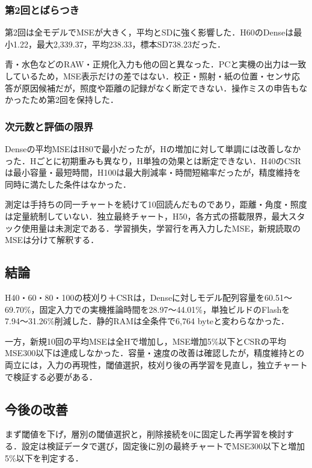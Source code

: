 \documentclass[
  10pt,
  a4paper,
]{article}
\begin{document}
\subsubsection{第2回とばらつき}\label{ux7b2c2ux56deux3068ux3070ux3089ux3064ux304d}

第2回は全モデルでMSEが大きく，平均とSDに強く影響した．H60のDenseは最小1.22，最大2,339.37，平均238.33，標本SD738.23だった．

青・水色などのRAW・正規化入力も他の回と異なった．PCと実機の出力は一致しているため，MSE表示だけの差ではない．校正・照射・紙の位置・センサ応答が原因候補だが，照度や距離の記録がなく断定できない．操作ミスの申告もなかったため第2回を保持した．

\subsubsection{次元数と評価の限界}\label{ux6b21ux5143ux6570ux3068ux8a55ux4fa1ux306eux9650ux754c}

Denseの平均MSEはH80で最小だったが，Hの増加に対して単調には改善しなかった．Hごとに初期重みも異なり，H単独の効果とは断定できない．H40のCSRは最小容量・最短時間，H100は最大削減率・時間短縮率だったが，精度維持を同時に満たした条件はなかった．

測定は手持ちの同一チャートを続けて10回読んだものであり，距離・角度・照度は定量統制していない．独立最終チャート，H50，各方式の搭載限界，最大スタック使用量は未測定である．学習損失，学習行を再入力したMSE，新規読取のMSEは分けて解釈する．

\subsection{結論}\label{ux7d50ux8ad6}

H40・60・80・100の枝刈り＋CSRは，Denseに対しモデル配列容量を60.51〜69.70\%，固定入力での実機推論時間を28.97〜44.01\%，単独ビルドのFlashを7.94〜31.26\%削減した．静的RAMは全条件で6,764
byteと変わらなかった．

一方，新規10回の平均MSEは全Hで増加し，MSE増加5\%以下とCSRの平均MSE300以下は達成しなかった．容量・速度の改善は確認したが，精度維持との両立には，入力の再現性，閾値選択，枝刈り後の再学習を見直し，独立チャートで検証する必要がある．

\subsection{今後の改善}\label{ux4ecaux5f8cux306eux6539ux5584}

まず閾値を下げ，層別の閾値選択と，削除接続を0に固定した再学習を検討する．設定は検証データで選び，固定後に別の最終チャートでMSE300以下と増加5\%以下を判定する．
\end{document}
